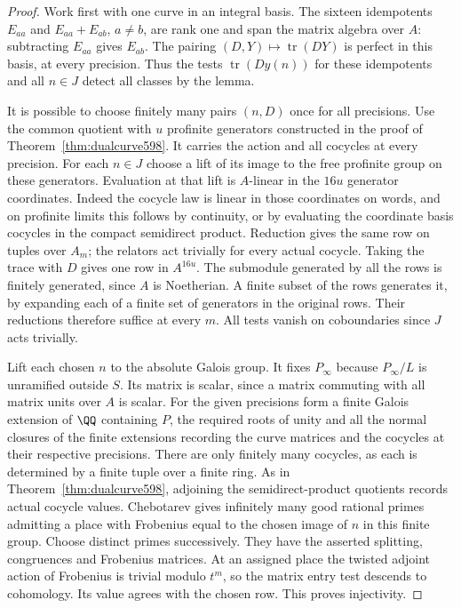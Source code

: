 \documentclass[a4paper,11pt]{article}
\theoremstyle{definition}
\theoremstyle{remark}
\numberwithin{equation}{section}
\begin{document}
\begin{proof}
Work first with one curve in an integral basis. The sixteen
idempotents \(E_{aa}\) and \(E_{aa}+E_{ab}\), \(a\ne b\),
are rank one and span the matrix algebra over \(A\):
subtracting \(E_{aa}\) gives \(E_{ab}\). The pairing
\((D,Y)\mapsto\operatorname{tr}(DY)\) is perfect in
this basis, at every precision. Thus the tests
\(\operatorname{tr}(D y(n))\) for these idempotents
and all \(n\in J\) detect all classes by the lemma.

It is possible to choose finitely many pairs \((n,D)\)
once for all precisions. Use the common quotient with
\(u\) profinite generators constructed in the proof of
Theorem~\ref{thm:dualcurve598}. It carries the action and
all cocycles at every precision. For each \(n\in J\) choose
a lift of its image to the free profinite group on these
generators. Evaluation at that lift is \(A\)-linear in
the \(16u\) generator coordinates. Indeed the cocycle law
is linear in those coordinates on words, and on profinite
limits this follows by continuity, or by evaluating the
coordinate basis cocycles in the compact semidirect
product. Reduction gives the same row on tuples over
\(A_m\); the relators act trivially for every actual
cocycle. Taking the trace with \(D\) gives one row in
\(A^{16u}\). The submodule generated by all the rows is
finitely generated, since \(A\) is Noetherian. A finite
subset of the rows generates it, by expanding each of
a finite set of generators in the original rows. Their
reductions therefore suffice at every \(m\). All tests
vanish on coboundaries since \(J\) acts trivially.

Lift each chosen \(n\) to the absolute Galois group.
It fixes \(P_\infty\) because \(P_\infty/L\) is unramified
outside \(S\). Its matrix is scalar, since a matrix commuting
with all matrix units over \(A\) is scalar. For the given
precisions form a finite Galois extension of \(\QQ\)
containing \(P\), the required roots of unity and all
the normal closures of the finite extensions recording
the curve matrices and the cocycles at their respective
precisions. There are only finitely many cocycles, as
each is determined by a finite tuple over a finite ring.
As in Theorem~\ref{thm:dualcurve598}, adjoining the
semidirect-product quotients records actual cocycle
values. Chebotarev gives infinitely many good rational
primes admitting a place with Frobenius equal to the
chosen image of \(n\) in this finite group. Choose
distinct primes successively. They have the asserted
splitting, congruences and Frobenius matrices. At an
assigned place the twisted adjoint action of Frobenius
is trivial modulo \(t^m\), so the matrix entry test
descends to cohomology. Its value agrees with the
chosen row. This proves injectivity.
\end{proof}
\end{document}
